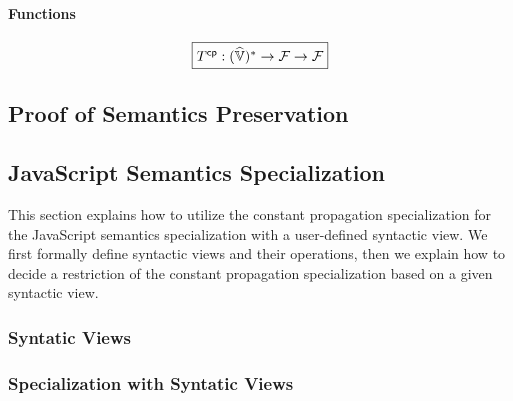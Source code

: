 \paragraph{Functions}
\[
  \framebox{$\cptransform: (\avalset)^* \rightarrow \funcset \rightarrow
  \funcset$}
\]

\todo





% 
% 
% 
% 








\subsection{Proof of Semantics Preservation}

\todo





\subsection{JavaScript Semantics Specialization}

This section explains how to utilize the constant propagation specialization for
the JavaScript semantics specialization with a user-defined syntactic view.  We
first formally define syntactic views and their operations, then we explain how
to decide a restriction of the constant propagation specialization based on a
given syntactic view.

\subsubsection{Syntatic Views}

\todo

\subsubsection{Specialization with Syntatic Views}

\todo
